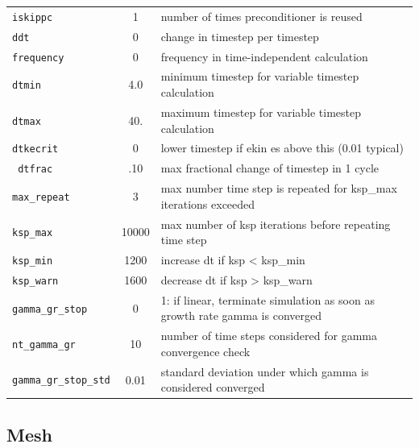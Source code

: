 \begin{tabular}{lcp{4in}}
  \texttt{iskippc} & 1 & number of times preconditioner is reused \\
  \texttt{ddt}     & 0 & change in timestep per timestep \\
  \texttt{frequency} & 0 & frequency in time-independent calculation \\
  \texttt{dtmin}     & 4.0 & minimum timestep for variable timestep calculation \\
  \texttt{dtmax}     & 40. & maximum timestep for variable timestep calculation \\
  \texttt{dtkecrit}  & 0 &  lower timestep if ekin es above this (0.01 typical) \\
  \texttt{ dtfrac}   & .10 & max fractional change of timestep in 1 cycle \\
  \texttt{max\_repeat}  & 3 & max number time step is repeated for ksp\_max iterations exceeded \\
  \texttt{ksp\_max}     & 10000 & max number of ksp iterations before repeating time step \\
  \texttt{ksp\_min}     & 1200  & increase dt if ksp < ksp\_min  \\
  \texttt{ksp\_warn}    & 1600  & decrease dt if ksp > ksp\_warn \\
  \texttt{gamma\_gr\_stop}    & 0  & 1: if linear, terminate simulation as soon as growth rate gamma is converged \\
  \texttt{nt\_gamma\_gr}    & 10  & number of time steps considered for gamma convergence check \\
  \texttt{gamma\_gr\_stop\_std}    & 0.01  & standard deviation under which gamma is considered converged \\
\end{tabular}

\subsection{Mesh}

